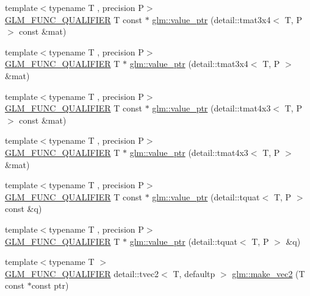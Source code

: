 \begin{DoxyCompactItemize}
\item 
{\footnotesize template$<$typename T , precision P$>$ }\\\hyperlink{setup_8hpp_a33fdea6f91c5f834105f7415e2a64407}{G\+L\+M\+\_\+\+F\+U\+N\+C\+\_\+\+Q\+U\+A\+L\+I\+F\+I\+ER} T const  $\ast$ \hyperlink{group__gtc__type__ptr_ga233effe326542ae9657b8feac80e541f}{glm\+::value\+\_\+ptr} (detail\+::tmat3x4$<$ T, P $>$ const \&mat)
\item 
{\footnotesize template$<$typename T , precision P$>$ }\\\hyperlink{setup_8hpp_a33fdea6f91c5f834105f7415e2a64407}{G\+L\+M\+\_\+\+F\+U\+N\+C\+\_\+\+Q\+U\+A\+L\+I\+F\+I\+ER} T $\ast$ \hyperlink{group__gtc__type__ptr_gad8c6b1dbda2b48d19fd1bc8b01cf701c}{glm\+::value\+\_\+ptr} (detail\+::tmat3x4$<$ T, P $>$ \&mat)
\item 
{\footnotesize template$<$typename T , precision P$>$ }\\\hyperlink{setup_8hpp_a33fdea6f91c5f834105f7415e2a64407}{G\+L\+M\+\_\+\+F\+U\+N\+C\+\_\+\+Q\+U\+A\+L\+I\+F\+I\+ER} T const  $\ast$ \hyperlink{group__gtc__type__ptr_gaebe5b66d8b05f6ace85d26cedd03732d}{glm\+::value\+\_\+ptr} (detail\+::tmat4x3$<$ T, P $>$ const \&mat)
\item 
{\footnotesize template$<$typename T , precision P$>$ }\\\hyperlink{setup_8hpp_a33fdea6f91c5f834105f7415e2a64407}{G\+L\+M\+\_\+\+F\+U\+N\+C\+\_\+\+Q\+U\+A\+L\+I\+F\+I\+ER} T $\ast$ \hyperlink{group__gtc__type__ptr_ga4a4b23867cc26441441ff4458844fa27}{glm\+::value\+\_\+ptr} (detail\+::tmat4x3$<$ T, P $>$ \&mat)
\item 
{\footnotesize template$<$typename T , precision P$>$ }\\\hyperlink{setup_8hpp_a33fdea6f91c5f834105f7415e2a64407}{G\+L\+M\+\_\+\+F\+U\+N\+C\+\_\+\+Q\+U\+A\+L\+I\+F\+I\+ER} T const  $\ast$ \hyperlink{group__gtc__type__ptr_ga961a5b150a0ffd632aaa0252c4d6b9ab}{glm\+::value\+\_\+ptr} (detail\+::tquat$<$ T, P $>$ const \&q)
\item 
{\footnotesize template$<$typename T , precision P$>$ }\\\hyperlink{setup_8hpp_a33fdea6f91c5f834105f7415e2a64407}{G\+L\+M\+\_\+\+F\+U\+N\+C\+\_\+\+Q\+U\+A\+L\+I\+F\+I\+ER} T $\ast$ \hyperlink{group__gtc__type__ptr_gab72389186ae9e8c822ff6cc9b474a37f}{glm\+::value\+\_\+ptr} (detail\+::tquat$<$ T, P $>$ \&q)
\item 
{\footnotesize template$<$typename T $>$ }\\\hyperlink{setup_8hpp_a33fdea6f91c5f834105f7415e2a64407}{G\+L\+M\+\_\+\+F\+U\+N\+C\+\_\+\+Q\+U\+A\+L\+I\+F\+I\+ER} detail\+::tvec2$<$ T, defaultp $>$ \hyperlink{group__gtc__type__ptr_ga70f570befb4773ba3a658b76f9fdd6ab}{glm\+::make\+\_\+vec2} (T const $\ast$const ptr)

\end{DoxyCompactItemize}
